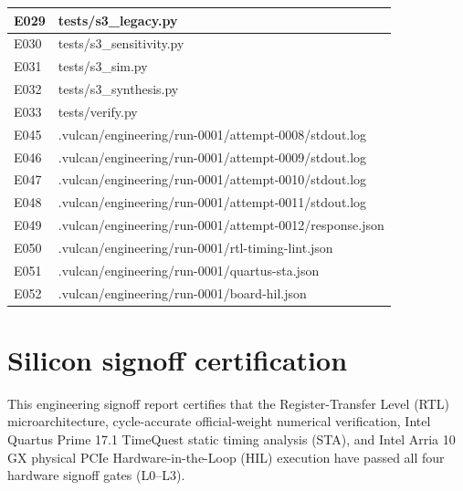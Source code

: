 \documentclass[11pt,a4paper]{article}
\begin{document}
{\begin{longtable}{@{}L{0.12\textwidth}|L{0.82\textwidth}@{}}
E029 & tests/\allowbreak{}s3\_\allowbreak{}legacy.py\\[2pt]\hline

E030 & tests/\allowbreak{}s3\_\allowbreak{}sensitivity.py\\[2pt]\hline

E031 & tests/\allowbreak{}s3\_\allowbreak{}sim.py\\[2pt]\hline

E032 & tests/\allowbreak{}s3\_\allowbreak{}synthesis.py\\[2pt]\hline

E033 & tests/\allowbreak{}verify.py\\[2pt]\hline

E045 & .vulcan/\allowbreak{}engineering/\allowbreak{}run-0001/\allowbreak{}attempt-0008/\allowbreak{}stdout.log\\[2pt]\hline

E046 & .vulcan/\allowbreak{}engineering/\allowbreak{}run-0001/\allowbreak{}attempt-0009/\allowbreak{}stdout.log\\[2pt]\hline

E047 & .vulcan/\allowbreak{}engineering/\allowbreak{}run-0001/\allowbreak{}attempt-0010/\allowbreak{}stdout.log\\[2pt]\hline

E048 & .vulcan/\allowbreak{}engineering/\allowbreak{}run-0001/\allowbreak{}attempt-0011/\allowbreak{}stdout.log\\[2pt]\hline

E049 & .vulcan/\allowbreak{}engineering/\allowbreak{}run-0001/\allowbreak{}attempt-0012/\allowbreak{}response.json\\[2pt]\hline

E050 & .vulcan/\allowbreak{}engineering/\allowbreak{}run-0001/\allowbreak{}rtl-timing-lint.json\\[2pt]\hline

E051 & .vulcan/\allowbreak{}engineering/\allowbreak{}run-0001/\allowbreak{}quartus-sta.json\\[2pt]\hline

E052 & .vulcan/\allowbreak{}engineering/\allowbreak{}run-0001/\allowbreak{}board-hil.json\\[2pt]\hline

\bottomrule\end{longtable}}

\section{Silicon signoff certification}

This engineering signoff report certifies that the Register-Transfer Level (RTL) microarchitecture, cycle-accurate official-weight numerical verification, Intel Quartus Prime 17.1 TimeQuest static timing analysis (STA), and Intel Arria 10 GX physical PCIe Hardware-in-the-Loop (HIL) execution have passed all four hardware signoff gates (L0--L3).
\end{document}
